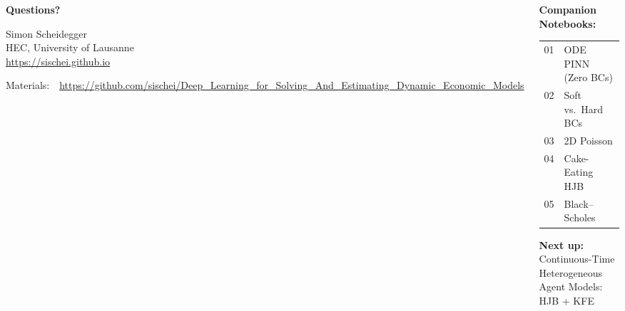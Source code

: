 \documentclass[aspectratio=169,11pt]{beamer}
\begin{document}
\begin{frame}{}
\begin{columns}[c]
\begin{center}
{\Huge \textcolor{uzhblue}{\textbf{Questions?}}}

\vspace{1.0cm}
{\large Simon Scheidegger}\\[4pt]
{\small HEC, University of Lausanne}\\[4pt]
\url{https://sischei.github.io}

\vspace{0.6cm}
{\small Materials:~~\url{https://github.com/sischei/Deep_Learning_for_Solving_And_Estimating_Dynamic_Economic_Models}}
\end{center}

\begin{center}
\textbf{Companion Notebooks:}\\[8pt]
{\small
\begin{tabular}{rl}
01 & ODE PINN (Zero BCs) \\
02 & Soft vs.\ Hard BCs \\
03 & 2D Poisson \\
04 & Cake-Eating HJB \\
05 & Black--Scholes \\
\end{tabular}
}

\vspace{0.8cm}
\textbf{Next up:}\\[6pt]
{\large Continuous-Time Heterogeneous}\\
{\large Agent Models: HJB + KFE}\\[8pt]
\end{center}
\end{columns}
\end{frame}
\end{document}
